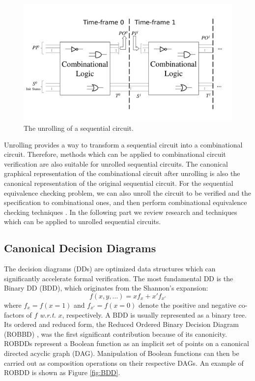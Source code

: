 \begin{figure}[tbp]
\centerline{
\includegraphics[width=\textwidth]{newfig/unroll.pdf}
}
\caption{The unrolling of a sequential circuit.}
\label{fig:unrolling}
\end{figure}

Unrolling provides a way to transform a sequential circuit into a combinational 
circuit. Therefore,  methods which can be applied to combinational circuit 
verification are also suitable for unrolled sequential circuits. The canonical 
graphical representation of the combinational circuit after unrolling is also 
the canonical representation of the original sequential circuit. For the sequential 
equivalence checking problem, we can also unroll the circuit to be verified and the 
specification to combinational ones, and then perform combinational equivalence checking
techniques \cite{savoj2010combinational}. In the following part we review research and techniques which 
can be applied to unrolled sequential circuits.

\subsection{Canonical Decision Diagrams}
The decision diagrams (DDs) are optimized data structures which can significantly accelerate formal verification.
The most fundamental DD is the Binary DD (BDD), which originates from the 
Shannon's expansion:
\begin{equation}
f(x, y, \dots) = x f_x + x' f_{x'}
\end{equation}
where $f_x = f(x = 1)$ and $f_{x'} = f(x = 0)$ denote the positive and
negative co-factors of $f$ {\it w.r.t.} $x$, respectively.
A BDD is usually represented as a binary tree.
Its ordered and reduced form, the Reduced Ordered Binary Decision Diagram (ROBBD)
\cite{BRYA86}, was the first significant contribution because of its canonicity.  
ROBDDs represent a Boolean function as an
implicit set of points on a canonical directed acyclic graph
(DAG). Manipulation of Boolean functions can then be carried out as
composition operations on their respective DAGs. An example of ROBDD is shown as Figure \ref{fig:BDD}.

